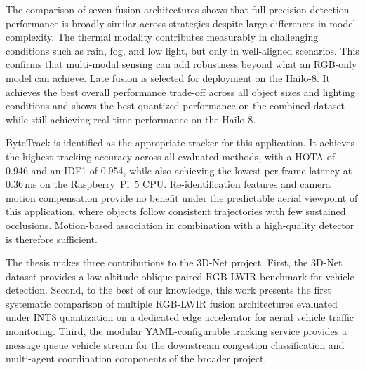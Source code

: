 \documentclass[12pt,oneside,bibtotoc,liststotoc]{scrbook}
\begin{document}
The comparison of seven fusion architectures shows that full-precision detection performance
is broadly similar across strategies despite large differences in model complexity. The
thermal modality contributes measurably in challenging conditions such as rain, fog, and
low light, but only in well-aligned scenarios. This confirms that multi-modal
sensing can add robustness beyond what an RGB-only
model can achieve. Late fusion is selected for deployment on the Hailo-8. It achieves the 
best overall
performance trade-off across all object sizes and lighting conditions and shows the best
quantized performance on the combined dataset while still achieving real-time performance
on the Hailo-8.

ByteTrack is identified as the appropriate tracker for this application. It achieves the
highest tracking accuracy across all evaluated methods, with a HOTA of 0.946 and an IDF1
of 0.954, while also achieving the lowest per-frame latency at 0.36\,ms on the
Raspberry~Pi~5 CPU. Re-identification features and camera motion compensation provide no
benefit under the predictable aerial viewpoint of this application, where objects follow
consistent trajectories with few sustained occlusions. Motion-based association in
combination with a high-quality detector is therefore sufficient.

The thesis makes three contributions to the 3D-Net project. First, the 3D-Net dataset
provides a low-altitude oblique paired RGB-LWIR benchmark for vehicle detection.
Second, to the best of our knowledge, this work presents the first
systematic comparison of multiple RGB-LWIR fusion architectures evaluated under INT8
quantization on a dedicated edge accelerator for aerial vehicle traffic monitoring. Third,
the modular YAML-configurable tracking service provides a message queue vehicle stream for the
downstream congestion classification and multi-agent coordination components of the broader
project.
\end{document}
